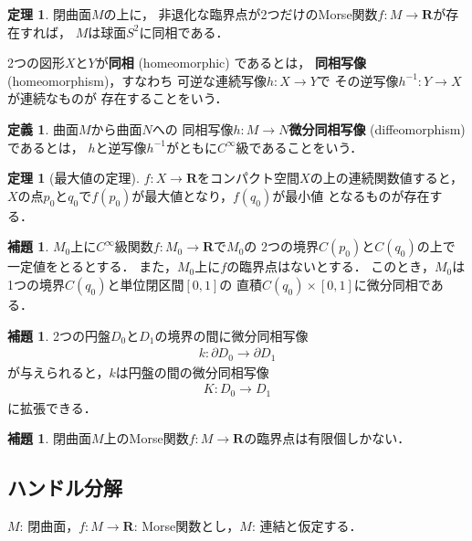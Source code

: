 \documentclass[11pt, a4paper, dvipdfmx]{jsarticle}
\theoremstyle{definition}
\newcommand{\rr}{\mathbf{R}}
\newcommand{\p}{\partial}
\theoremstyle{mystyle}
\newtheorem{DFN}[Axiom]{定義}
\newtheorem{THM}[Axiom]{定理}
\newtheorem{LMM}[Axiom]{補題}
\numberwithin{equation}{section} %
\begin{document}
\begin{THM}
    閉曲面$M$の上に，
    非退化な臨界点が2つだけのMorse関数$f\colon M\to \rr$が存在すれば，
    $M$は球面$S^2$に同相である．
\end{THM}

2つの図形$X$と$Y$が\textbf{同相} (homeomorphic) であるとは，
\textbf{同相写像} (homeomorphism)，すなわち
可逆な連続写像$h\colon X\to Y$で
その逆写像$h^{-1}\colon Y\to X$が連続なものが
存在することをいう．

\begin{DFN}
    曲面$M$から曲面$N$への
    同相写像$h\colon M\to N$\textbf{微分同相写像} (diffeomorphism) であるとは，
    $h$と逆写像$h^{-1}$がともに$C^{\infty}$級であることをいう．
\end{DFN}

\begin{THM}[最大値の定理]
    $f\colon X\to \rr$をコンパクト空間$X$の上の連続関数値すると，
    $X$の点$p_0$と$q_0$で$f(p_0)$が最大値となり，$f(q_0)$が最小値
    となるものが存在する．
\end{THM}

\begin{LMM}
    $M_0$上に$C^{\infty}$級関数$f\colon M_0\to\rr$で$M_0$の
    2つの境界$C(p_0)$と$C(q_0)$の上で一定値をとるとする．
    また，$M_0$上に$f$の臨界点はないとする．
    このとき，$M_0$は1つの境界$C(q_0)$と単位閉区間$[0,1]$の
    直積$C(q_0)\times[0,1]$に微分同相である．
\end{LMM}

\begin{LMM}2つの円盤$D_0$と$D_1$の境界の間に微分同相写像
    \begin{align}
        k\colon\p D_0\to\p D_1
    \end{align}
    が与えられると，$k$は円盤の間の微分同相写像
    \begin{align}
        K\colon D_0\to D_1
    \end{align}
    に拡張できる．
\end{LMM}

\begin{LMM}\label{lmm:crit-fin}
    閉曲面$M$上のMorse関数$f\colon M\to\rr$の臨界点は有限個しかない．
\end{LMM}
\subsection{ハンドル分解}

$M$: 閉曲面，$f\colon M\to\rr$: Morse関数とし，$M$: 連結と仮定する．
\end{document}
